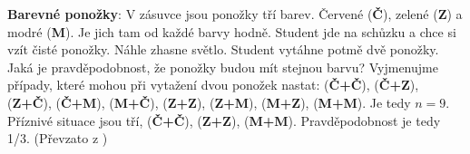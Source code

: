 \begin{example}
 \label{mai:exam006}
  \textbf{Barevné ponožky}:\newline
  V zásuvce jsou ponožky tří barev. Červené (\textbf{Č}), zelené (\textbf{Z}) a modré (\textbf{M}). 
  Je jich tam od každé barvy hodně. Student jde na schůzku a chce si vzít čisté ponožky. Náhle 
  zhasne světlo. Student vytáhne potmě dvě ponožky. Jaká je pravděpodobnost, že ponožky budou mít 
  stejnou barvu? Vyjmenujme případy, které mohou při vytažení dvou ponožek nastat: (\textbf{Č+Č}), 
  (\textbf{Č+Z}), (\textbf{Z+Č}), (\textbf{Č+M}), (\textbf{M+Č}), (\textbf{Z+Z}), (\textbf{Z+M}), 
  (\textbf{M+Z}), (\textbf{M+M}). Je tedy \(n = 9\). Příznivé situace jsou tří, (\textbf{Č+Č}), 
  (\textbf{Z+Z}), (\textbf{M+M}). Pravděpodobnost je tedy 1/3. (Převzato z 
  \cite[s.~200]{Musilova2009MA1}) 
\end{example}